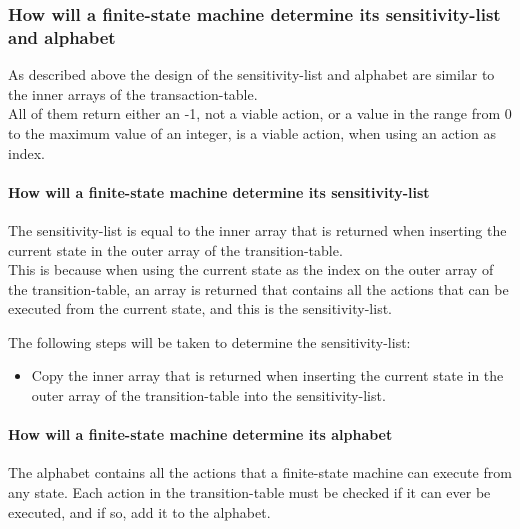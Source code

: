 \hypertarget{how-will-a-finite-state-machine-determine-its-sensitivity-list-and-alphabet}{%
\subsubsection{How will a finite-state machine determine its
sensitivity-list and
alphabet}\label{how-will-a-finite-state-machine-determine-its-sensitivity-list-and-alphabet}}

As described above the design of the sensitivity-list and alphabet are
similar to the inner arrays of the transaction-table.\\
All of them return either an -1, not a viable action, or a value in the
range from 0 to the maximum value of an integer, is a viable action,
when using an action as index.

\hypertarget{how-will-a-finite-state-machine-determine-its-sensitivity-list}{%
\paragraph{How will a finite-state machine determine its
sensitivity-list}\label{how-will-a-finite-state-machine-determine-its-sensitivity-list}}

The sensitivity-list is equal to the inner array that is returned when
inserting the current state in the outer array of the
transition-table.\\
This is because when using the current state as the index on the outer
array of the transition-table, an array is returned that contains all
the actions that can be executed from the current state, and this is the
sensitivity-list.

The following steps will be taken to determine the sensitivity-list:

\begin{itemize}
\tightlist
\item
  Copy the inner array that is returned when inserting the current state
  in the outer array of the transition-table into the sensitivity-list.
\end{itemize}

\hypertarget{how-will-a-finite-state-machine-determine-its-alphabet}{%
\paragraph{How will a finite-state machine determine its
alphabet}\label{how-will-a-finite-state-machine-determine-its-alphabet}}

The alphabet contains all the actions that a finite-state machine can
execute from any state. Each action in the transition-table must be
checked if it can ever be executed, and if so, add it to the alphabet.

